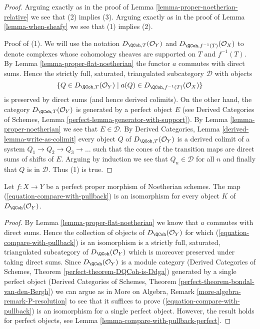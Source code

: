\begin{proof}
Arguing exactly as in the proof of
Lemma \ref{lemma-proper-noetherian-relative}
we see that (2) implies (3).
Arguing exactly as in the proof of
Lemma \ref{lemma-when-sheafy}
we see that (1) implies (2).

\medskip\noindent
Proof of (1). We will use the notation $D_{\QCoh, T}(\mathcal{O}_Y)$ and
$D_{\QCoh, f^{-1}(T)}(\mathcal{O}_X)$ to denote complexes
whose cohomology sheaves are supported on $T$ and $f^{-1}(T)$.
By Lemma \ref{lemma-proper-flat-noetherian} the functor $a$ commutes
with direct sums. Hence the strictly full, saturated, triangulated
subcategory $\mathcal{D}$ with objects
$$
\{Q \in D_{\QCoh, T}(\mathcal{O}_Y) \mid
a(Q) \in D_{\QCoh, f^{-1}(T)}(\mathcal{O}_X)\}
$$
is preserved by direct sums (and hence derived colimits).
On the other hand, the
category $D_{\QCoh, T}(\mathcal{O}_Y)$ is generated by a perfect
object $E$ (see Derived Categories of Schemes, Lemma
\ref{perfect-lemma-generator-with-support}).
By Lemma \ref{lemma-proper-noetherian} we see that $E \in \mathcal{D}$.
By Derived Categories, Lemma \ref{derived-lemma-write-as-colimit}
every object $Q$ of $D_{\QCoh, T}(\mathcal{O}_Y)$ is a derived
colimit of a system $Q_1 \to Q_2 \to Q_3 \to \ldots$
such that the cones of the transition maps are direct sums
of shifts of $E$. Arguing by induction we see that
$Q_n \in \mathcal{D}$ for all $n$ and finally that $Q$ is
in $\mathcal{D}$. Thus (1) is true.
\end{proof}

\begin{lemma}
\label{lemma-compare-with-pullback-flat-proper-noetherian}
Let $f : X \to Y$ be a perfect proper morphism of Noetherian
schemes. The map (\ref{equation-compare-with-pullback}) is an isomorphism
for every object $K$ of $D_\QCoh(\mathcal{O}_Y)$.
\end{lemma}

\begin{proof}
By Lemma \ref{lemma-proper-flat-noetherian} we know that $a$ commutes
with direct sums. Hence the collection of objects of
$D_\QCoh(\mathcal{O}_Y)$ for which (\ref{equation-compare-with-pullback})
is an isomorphism is a strictly full, saturated, triangulated
subcategory of $D_\QCoh(\mathcal{O}_Y)$ which is moreover
preserved under taking direct sums. Since $D_\QCoh(\mathcal{O}_Y)$
is a module category (Derived Categories of Schemes, Theorem
\ref{perfect-theorem-DQCoh-is-Ddga}) generated by a single
perfect object (Derived Categories of Schemes, Theorem
\ref{perfect-theorem-bondal-van-den-Bergh})
we can argue as in
More on Algebra, Remark \ref{more-algebra-remark-P-resolution}
to see that it suffices to prove (\ref{equation-compare-with-pullback})
is an isomorphism for a single perfect object.
However, the result holds for perfect objects, see
Lemma \ref{lemma-compare-with-pullback-perfect}.
\end{proof}

